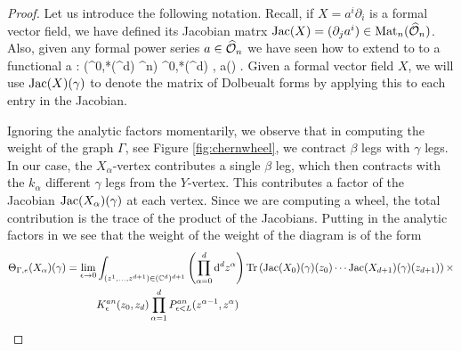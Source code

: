 
\begin{proof}

Let us introduce the following notation. 
Recall, if $X = a^i \partial_i$ is a formal vector field, we have defined its Jacobian matrx ${\rm Jac}(X) = (\partial_j a^i) \in {\rm Mat}_n(\widehat{\mathcal O}_n)$.
Also, given any formal power series $a \in \widehat{\mathcal O}_n$ we have seen how to extend to to a functional
\ben
a : \Sym(\Omega^{0,*}(\CC^d) \tensor \CC^n) \to \Omega^{0,*}(\CC^d) \;\; , \;\; \gamma \mapsto a(\gamma) .
\een
Given a formal vector field $X$, we will use ${\rm Jac}(X)(\gamma)$ to denote the matrix of Dolbeualt forms by applying this to each entry in the Jacobian.

Ignoring the analytic factors momentarily, 
we observe that in computing the weight of the graph $\Gamma$, see Figure \ref{fig:chernwheel},
we contract $\beta$ legs with $\gamma$ legs.
In our case, the $X_\alpha$-vertex contributes a single $\beta$ leg,
which then contracts with the $k_\alpha$ different $\gamma$ legs from the $Y$-vertex.
This contributes a factor of the Jacobian ${\rm Jac}(X_\alpha)(\gamma)$ at each vertex.
Since we are computing a wheel, the total contribution is the trace of the product of the Jacobians. 
Putting in the analytic factors in we see that the weight of the weight of the diagram is of the form
\begin{align*}
\Theta_{\Gamma,e}(X_\alpha) (\gamma) = \lim_{\epsilon \to 0} & \int_{(z^1,\ldots, z^{d+1}) \in (\mathbb C^d)^{d+1}} \left(\prod_{\alpha=0}^d {\rm d}^d z^\alpha\right) {\rm Tr}\left({\rm Jac}(X_0) (\gamma)(z_0) \cdots {\rm Jac}(X_{d+1})(\gamma)(z_{d+1})\right) \times \\
&  K^{an}_\epsilon(z_0,z_d) \prod_{\alpha = 1}^{d} P_{\epsilon < L}^{an}(z^{\alpha-1}, z^{\alpha}) 
\end{align*}


\end{proof}
